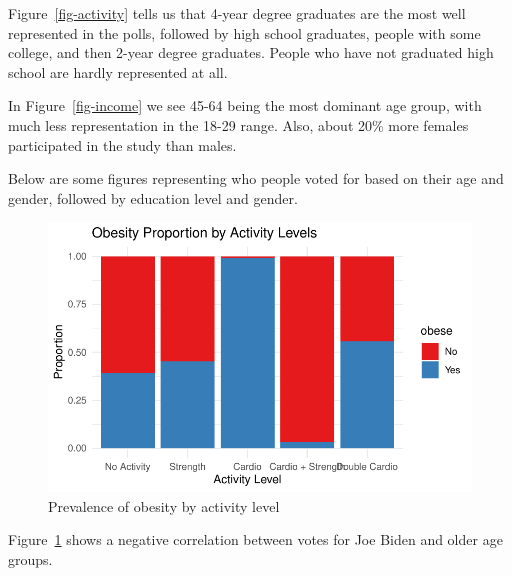 \documentclass[
  letterpaper,
  DIV=11,
  numbers=noendperiod]{scrartcl}
\begin{document}
Figure~\ref{fig-activity} tells us that 4-year degree graduates are the
most well represented in the polls, followed by high school graduates,
people with some college, and then 2-year degree graduates. People who
have not graduated high school are hardly represented at all.

In Figure~\ref{fig-income} we see 45-64 being the most dominant age
group, with much less representation in the 18-29 range. Also, about
20\% more females participated in the study than males.

Below are some figures representing who people voted for based on their
age and gender, followed by education level and gender.

\begin{figure}

{\centering \includegraphics[width=\textwidth,height=0.2\textheight]{paper_files/figure-pdf/fig-activityobesity-1.pdf}

}

\caption{\label{fig-activityobesity}Prevalence of obesity by activity
level}

\end{figure}

Figure~\ref{fig-activityobesity} shows a negative correlation between
votes for Joe Biden and older age groups.
\end{document}
